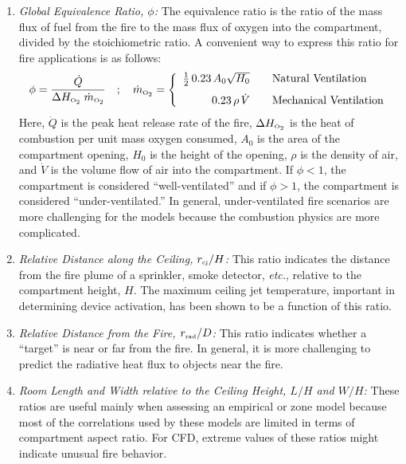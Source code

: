 \documentclass[graybox]{svmult}
\begin{document}
\begin{enumerate}
\item {\em Global Equivalence Ratio, $\phi$:}
The equivalence ratio is the ratio of the mass flux of fuel from the fire to the mass flux of oxygen into the compartment, divided by the stoichiometric ratio. A convenient way to express this ratio for fire applications is as follows:
\begin{equation}
   \phi = \frac{\dot{Q}}{\Delta H_{\hbox{\tiny O$_2$}} \; \dot{m}_{\hbox{\tiny O$_2$}} } \quad ; \quad  \dot{m}_{\hbox{\tiny O$_2$}} = \left\{
   \begin{array}{r@{\quad \quad}l}
      \frac{1}{2} \, 0.23 \, A_0 \sqrt{H_0} & \hbox{Natural Ventilation} \\ [0.1in]
      0.23 \, \rho \, \dot{V}       & \hbox{Mechanical Ventilation} \end{array} \right.
\end{equation}
Here, $\dot{Q}$ is the peak heat release rate of the fire, $\Delta H_{\hbox{\tiny O$_2$}}$ is the heat of combustion per unit mass oxygen consumed, $A_0$ is the area of the compartment opening, $H_0$ is the height of the opening, $\rho$ is the density of air, and $\dot{V}$ is the
volume flow of air into the compartment. If $\phi<1$, the compartment is considered ``well-ventilated'' and if $\phi>1$, the compartment is considered ``under-ventilated.''
In general, under-ventilated fire scenarios are more challenging for the models because the combustion physics are more complicated.

\item {\em Relative Distance along the Ceiling, $r_{\hbox{\tiny cj}}/H$:}
This ratio indicates the distance from the fire plume of a sprinkler, smoke detector, {\em etc.}, relative to the
compartment height, $H$. The maximum ceiling jet temperature, important  in determining device activation, has been shown to be a function of this ratio.

\item {\em Relative Distance from the Fire, $r_{\hbox{\tiny rad}}/D$:}
This ratio indicates whether a ``target'' is near or far from the fire. In general, it is more challenging to predict the
radiative heat flux to objects near the fire.

\item {\em Room Length and Width relative to the Ceiling Height, $L/H$ and $W/H$:}
These ratios are useful mainly when assessing an empirical or zone model because most of the correlations used
by these models are limited in terms of compartment aspect ratio. For CFD, extreme values of these ratios might indicate unusual fire behavior.


\end{enumerate}
\end{document}
